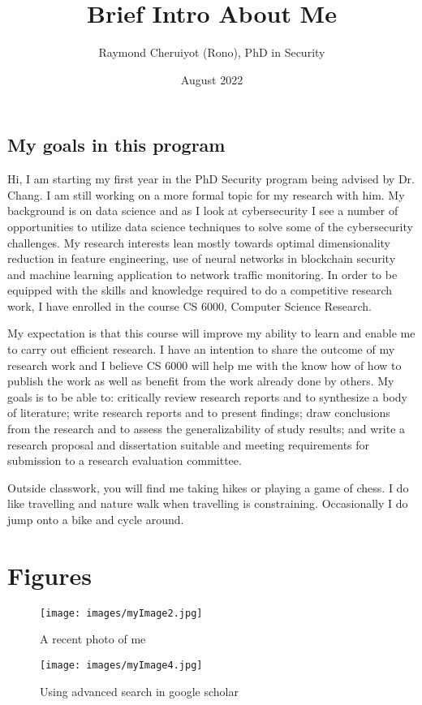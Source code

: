 \documentclass{article}
\title{Brief Intro About Me}
\author{Raymond Cheruiyot (Rono), PhD in Security}
\date{August 2022}
\begin{document}
\maketitle

\begin{multicols}{2}

\section{My goals in this program}
Hi, I am starting my first year in the PhD Security program being advised by Dr. Chang. I am still working on a more formal topic for my research with him. My background is on data science and as I look at cybersecurity I see a number of opportunities to utilize data science techniques to solve some of the cybersecurity challenges. My research interests lean mostly towards optimal dimensionality reduction in feature engineering, use of neural networks in blockchain security and machine learning application to network traffic monitoring. In order to be equipped with the skills and knowledge required to do a competitive research work, I have enrolled in the course CS 6000, Computer Science Research. 

My expectation is that this course will improve my ability to learn and enable me to carry out efficient research. I have an intention to share the outcome of my research work and I believe CS 6000 will help me with the know how of how to publish the work as well as benefit from the work already done by others. My goals is to be able to: critically review research reports and to synthesize a body of literature; write research reports and to present findings; draw conclusions from the research and to assess the generalizability of study results; and write a research proposal and dissertation suitable and meeting requirements for submission to a research evaluation committee.



Outside classwork, you will find me taking hikes or playing a game of chess. I do like travelling and nature walk when travelling is constraining. Occasionally I do jump onto a bike and cycle around.

\end{multicols}

\section{Figures}
\begin{figure}[H]
 \centering
 \texttt{[image: images/myImage2.jpg]}
 \caption{A recent photo of me}
 \label{fig:float}
\end{figure}
\begin{figure}[H]
 \centering
  \texttt{[image: images/myImage4.jpg]}
 \caption{Using advanced search in google scholar}
 \label{fig:2}
\end{figure}
\end{document}
